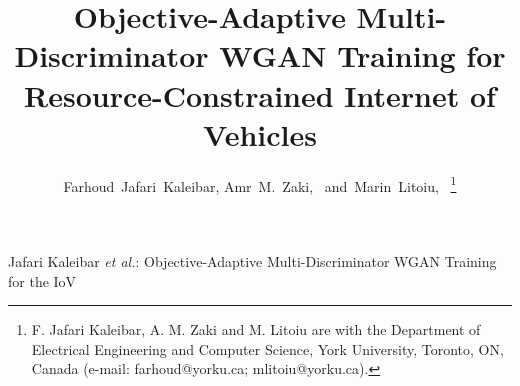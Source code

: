 \documentclass[journal]{IEEEtran}
\begin{document}
\title{Objective-Adaptive Multi-Discriminator WGAN Training for\\
Resource-Constrained Internet of Vehicles}

\author{Farhoud~Jafari~Kaleibar,
        Amr~M.~Zaki,~
        and~Marin~Litoiu,~
\thanks{F. Jafari Kaleibar, A. M. Zaki and M. Litoiu are with the Department of
Electrical Engineering and Computer Science, York University, Toronto, ON,
Canada (e-mail: farhoud@yorku.ca; mlitoiu@yorku.ca).}}

%
{Jafari Kaleibar \MakeLowercase{\textit{et al.}}: Objective-Adaptive Multi-Discriminator WGAN Training for the IoV}

\maketitle
\end{document}
